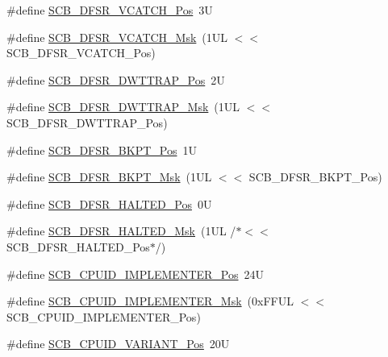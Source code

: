 \begin{DoxyCompactItemize}
\item 
\#define \mbox{\hyperlink{group___c_m_s_i_s___s_c_b_gad02d3eaf062ac184c18a7889c9b6de57}{S\+C\+B\+\_\+\+D\+F\+S\+R\+\_\+\+V\+C\+A\+T\+C\+H\+\_\+\+Pos}}~3U
\item 
\#define \mbox{\hyperlink{group___c_m_s_i_s___s_c_b_gacbb931575c07b324ec793775b7c44d05}{S\+C\+B\+\_\+\+D\+F\+S\+R\+\_\+\+V\+C\+A\+T\+C\+H\+\_\+\+Msk}}~(1\+U\+L $<$$<$ S\+C\+B\+\_\+\+D\+F\+S\+R\+\_\+\+V\+C\+A\+T\+C\+H\+\_\+\+Pos)
\item 
\#define \mbox{\hyperlink{group___c_m_s_i_s___s_c_b_gaccf82364c6d0ed7206f1084277b7cc61}{S\+C\+B\+\_\+\+D\+F\+S\+R\+\_\+\+D\+W\+T\+T\+R\+A\+P\+\_\+\+Pos}}~2U
\item 
\#define \mbox{\hyperlink{group___c_m_s_i_s___s_c_b_ga3f7384b8a761704655fd45396a305663}{S\+C\+B\+\_\+\+D\+F\+S\+R\+\_\+\+D\+W\+T\+T\+R\+A\+P\+\_\+\+Msk}}~(1\+U\+L $<$$<$ S\+C\+B\+\_\+\+D\+F\+S\+R\+\_\+\+D\+W\+T\+T\+R\+A\+P\+\_\+\+Pos)
\item 
\#define \mbox{\hyperlink{group___c_m_s_i_s___s_c_b_gaf28fdce48655f0dcefb383aebf26b050}{S\+C\+B\+\_\+\+D\+F\+S\+R\+\_\+\+B\+K\+P\+T\+\_\+\+Pos}}~1U
\item 
\#define \mbox{\hyperlink{group___c_m_s_i_s___s_c_b_ga609edf8f50bc49adb51ae28bcecefe1f}{S\+C\+B\+\_\+\+D\+F\+S\+R\+\_\+\+B\+K\+P\+T\+\_\+\+Msk}}~(1\+U\+L $<$$<$ S\+C\+B\+\_\+\+D\+F\+S\+R\+\_\+\+B\+K\+P\+T\+\_\+\+Pos)
\item 
\#define \mbox{\hyperlink{group___c_m_s_i_s___s_c_b_gaef4ec28427f9f88ac70a13ae4e541378}{S\+C\+B\+\_\+\+D\+F\+S\+R\+\_\+\+H\+A\+L\+T\+E\+D\+\_\+\+Pos}}~0U
\item 
\#define \mbox{\hyperlink{group___c_m_s_i_s___s_c_b_ga200bcf918d57443b5e29e8ce552e4bdf}{S\+C\+B\+\_\+\+D\+F\+S\+R\+\_\+\+H\+A\+L\+T\+E\+D\+\_\+\+Msk}}~(1\+U\+L /$\ast$$<$$<$ S\+C\+B\+\_\+\+D\+F\+S\+R\+\_\+\+H\+A\+L\+T\+E\+D\+\_\+\+Pos$\ast$/)
\item 
\#define \mbox{\hyperlink{group___c_m_s_i_s___s_c_b_ga58686b88f94f789d4e6f429fe1ff58cf}{S\+C\+B\+\_\+\+C\+P\+U\+I\+D\+\_\+\+I\+M\+P\+L\+E\+M\+E\+N\+T\+E\+R\+\_\+\+Pos}}~24U
\item 
\#define \mbox{\hyperlink{group___c_m_s_i_s___s_c_b_ga0932b31faafd47656a03ced75a31d99b}{S\+C\+B\+\_\+\+C\+P\+U\+I\+D\+\_\+\+I\+M\+P\+L\+E\+M\+E\+N\+T\+E\+R\+\_\+\+Msk}}~(0x\+F\+F\+U\+L $<$$<$ S\+C\+B\+\_\+\+C\+P\+U\+I\+D\+\_\+\+I\+M\+P\+L\+E\+M\+E\+N\+T\+E\+R\+\_\+\+Pos)
\item 
\#define \mbox{\hyperlink{group___c_m_s_i_s___s_c_b_ga104462bd0815391b4044a70bd15d3a71}{S\+C\+B\+\_\+\+C\+P\+U\+I\+D\+\_\+\+V\+A\+R\+I\+A\+N\+T\+\_\+\+Pos}}~20U

\end{DoxyCompactItemize}
